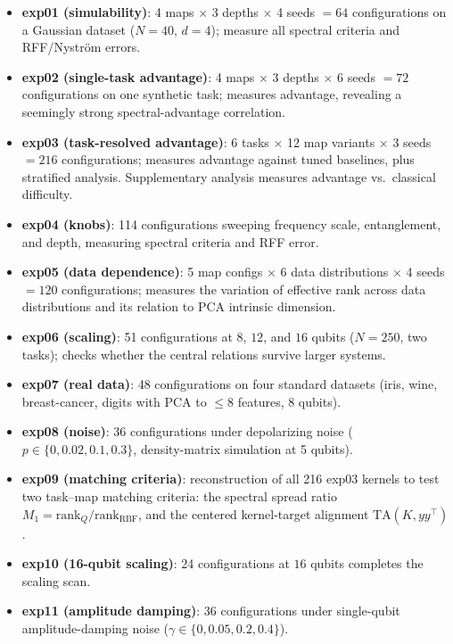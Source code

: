 \documentclass[aps,pra,preprint]{revtex4-2}
\begin{document}
\begin{itemize}
\item \textbf{exp01 (simulability)}: 4 maps $\times$ 3 depths $\times$ 4 seeds $=64$
configurations on a Gaussian dataset ($N=40$, $d=4$); measure all spectral criteria and
RFF/Nystr\"om errors.
\item \textbf{exp02 (single-task advantage)}: 4 maps $\times$ 3 depths $\times$ 6 seeds
$=72$ configurations on one synthetic task; measures advantage, revealing a seemingly
strong spectral-advantage correlation.
\item \textbf{exp03 (task-resolved advantage)}: 6 tasks $\times$ 12 map variants
$\times$ 3 seeds $=216$ configurations; measures advantage against tuned baselines,
plus stratified analysis. Supplementary analysis measures advantage vs.\ classical
difficulty.
\item \textbf{exp04 (knobs)}: 114 configurations sweeping frequency scale, entanglement,
and depth, measuring spectral criteria and RFF error.
\item \textbf{exp05 (data dependence)}: 5 map configs $\times$ 6 data distributions
$\times$ 4 seeds $=120$ configurations; measures the variation of effective rank across
data distributions and its relation to PCA intrinsic dimension.
\item \textbf{exp06 (scaling)}: 51 configurations at $8$, $12$, and $16$ qubits
($N=250$, two tasks); checks whether the central relations survive larger systems.
\item \textbf{exp07 (real data)}: 48 configurations on four standard datasets
(iris, wine, breast-cancer, digits with PCA to $\le8$ features, 8 qubits).
\item \textbf{exp08 (noise)}: 36 configurations under depolarizing noise
($p\in\{0,0.02,0.1,0.3\}$, density-matrix simulation at 5 qubits).
\item \textbf{exp09 (matching criteria)}: reconstruction of all 216 exp03 kernels to
test two task--map matching criteria: the spectral spread ratio
$M_1=\mathrm{rank}_Q/\mathrm{rank}_{\mathrm{RBF}}$, and the centered kernel-target
alignment $\mathrm{TA}(K,yy^{\top})$.
\item \textbf{exp10 (16-qubit scaling)}: 24 configurations at $16$ qubits completes the
scaling scan.
\item \textbf{exp11 (amplitude damping)}: 36 configurations under single-qubit
amplitude-damping noise ($\gamma\in\{0,0.05,0.2,0.4\}$).
\end{itemize}
\end{document}
